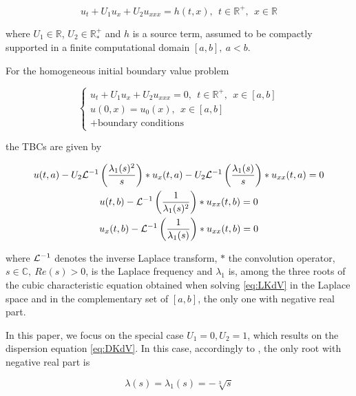 \begin{equation}
 	\label{eq:LKdV}
 	u_t + U_1u_x + U_2u_{xxx} = h(t,x), \ \ t \in \mathbb{R}^+, \ \ x \in \mathbb{R}
\end{equation}

\noindent where $U_1 \in \mathbb{R}$, $U_2 \in \mathbb{R}^+_*$ and $h$ is a source term, assumed to be compactly supported in a finite computational domain $[a,b], \ a < b$.

\indent For the homogeneous initial boundary value problem 

\begin{equation*}
\begin{cases}
	u_t + U_1u_x + U_2u_{xxx} = 0, \ \ t \in \mathbb{R}^+, \ \ x \in [a,b] \\
	u(0,x) = u_0(x), \ \ x \in [a,b] \\
	+ \text{boundary conditions} \nonumber
\end{cases}
\end{equation*}

\noindent the TBCs are given by \cite[equations (2.17) -(2.18)]{besse2015}

\begin{equation}
\label{eq:continuousTBC}
\begin{gathered}
        u(t,a) - U_2 \mathcal{L}^{-1} \left( \frac{\lambda_1(s)^2}{s} \right) * u_x(t,a) - U_2 \mathcal{L}^{-1} \left( \frac{\lambda_1(s)}{s} \right) * u_{xx}(t,a) = 0 \\ 
        u(t,b) - \mathcal{L}^{-1} \left( \frac{1}{\lambda_1(s)^2} \right) * u_{xx}(t,b) = 0 \\
        u_x(t,b) - \mathcal{L}^{-1} \left( \frac{1}{\lambda_1(s)} \right) * u_{xx}(t,b) = 0 
\end{gathered}
\end{equation}

\noindent where $\mathcal{L}^{-1}$ denotes the inverse Laplace transform, $*$ the convolution operator, $s \in \mathbb{C}, \ Re(s)>0$, is the Laplace frequency and $\lambda_1$ is, among the three roots of the cubic characteristic equation obtained when solving \eqref{eq:LKdV} in the Laplace space and in the complementary set of $[a,b]$, the only one with negative real part.

\indent In this paper, we focus on the special case $U_1 = 0, U_2 = 1$, which results on the dispersion equation \eqref{eq:DKdV}. In this case, accordingly to \cite{zheng2008}, the only root with negative real part is 

\begin{equation}
	\label{eq:lambda}
			\lambda(s) = \lambda_1(s) =  -\sqrt[3]{s} 
\end{equation}

